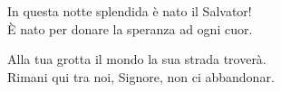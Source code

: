 
\strofa In questa notte splendida è nato il Salvator!\\
È nato per donare la speranza ad ogni cuor.

\spazio


\spazio

\strofa Alla tua grotta il mondo la sua strada troverà.\\
Rimani qui tra noi, Signore, non ci abbandonar.

\spazio


